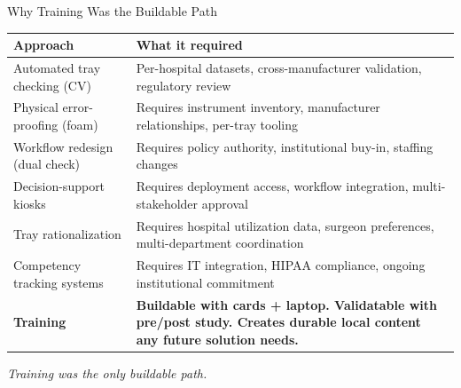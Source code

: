 \documentclass[10pt,aspectratio=169]{beamer}
\newcommand{\takeaway}[1]{%
  \vspace{0.25cm}
  \begin{center}\textit{\small #1}\end{center}
}
\begin{document}
\begin{frame}{Why Training Was the Buildable Path}
  \vspace{0.2cm}
  \footnotesize
  \begin{tabularx}{\textwidth}{l X}
    \toprule
    Approach & What it required \\
    \midrule
    Automated tray checking (CV) & Per-hospital datasets, cross-manufacturer
    validation, regulatory review \\
    Physical error-proofing (foam) & Requires instrument inventory, manufacturer
    relationships, per-tray tooling \\
    Workflow redesign (dual check) & Requires policy authority, institutional
    buy-in, staffing changes \\
    Decision-support kiosks & Requires deployment access, workflow integration,
    multi-stakeholder approval \\
    Tray rationalization & Requires hospital utilization data, surgeon
    preferences, multi-department coordination \\
    Competency tracking systems & Requires IT integration, HIPAA compliance,
    ongoing institutional commitment \\
    \textbf{Training} & \textbf{Buildable with cards + laptop. Validatable with
    pre/post study. Creates durable local content any future solution needs.} \\
    \bottomrule
  \end{tabularx}
  \vspace{0.3cm}
  \takeaway{Training was the only buildable path.}
\end{frame}
\end{document}
